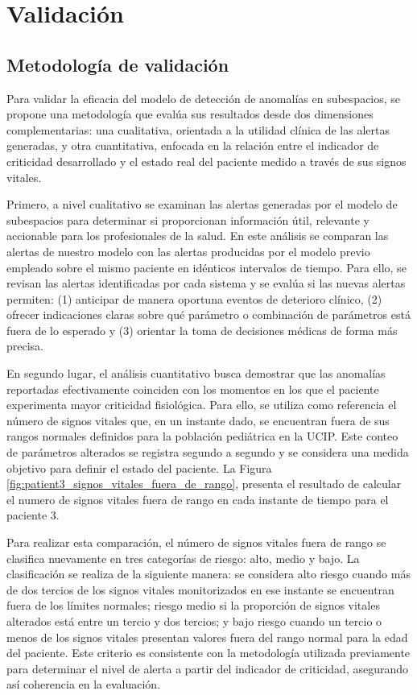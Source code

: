 \chapter{Validación}

\section{Metodología de validación}

Para validar la eficacia del modelo de detección de anomalías en subespacios, se propone una metodología que evalúa sus resultados desde dos dimensiones complementarias: una cualitativa, orientada a la utilidad clínica de las alertas generadas, y otra cuantitativa, enfocada en la relación entre el indicador de criticidad desarrollado y el estado real del paciente medido a través de sus signos vitales.

Primero, a nivel cualitativo se examinan las alertas generadas por el modelo de subespacios para determinar si proporcionan información útil, relevante y accionable para los profesionales de la salud. En este análisis se comparan las alertas de nuestro modelo con las alertas producidas por el modelo previo empleado sobre el mismo paciente en idénticos intervalos de tiempo. Para ello, se revisan las alertas identificadas por cada sistema y se evalúa si las nuevas alertas permiten: (1) anticipar de manera oportuna eventos de deterioro clínico, (2) ofrecer indicaciones claras sobre qué parámetro o combinación de parámetros está fuera de lo esperado y (3) orientar la toma de decisiones médicas de forma más precisa.

En segundo lugar, el análisis cuantitativo busca demostrar que las anomalías reportadas efectivamente coinciden con los momentos en los que el paciente experimenta mayor criticidad fisiológica. Para ello, se utiliza como referencia el número de signos vitales que, en un instante dado, se encuentran fuera de sus rangos normales definidos para la población pediátrica en la UCIP. Este conteo de parámetros alterados se registra segundo a segundo y se considera una medida objetivo para definir el estado del paciente. La Figura \ref{fig:patient3_signos_vitales_fuera_de_rango}, presenta el resultado de calcular el numero de signos vitales fuera de rango en cada instante de tiempo para el paciente 3.

Para realizar esta comparación, el número de signos vitales fuera de rango se clasifica nuevamente en tres categorías de riesgo: alto, medio y bajo. La clasificación se realiza de la siguiente manera: se considera alto riesgo cuando más de dos tercios de los signos vitales monitorizados en ese instante se encuentran fuera de los límites normales; riesgo medio si la proporción de signos vitales alterados está entre un tercio y dos tercios; y bajo riesgo cuando un tercio o menos de los signos vitales presentan valores fuera del rango normal para la edad del paciente. Este criterio es consistente con la metodología utilizada previamente para determinar el nivel de alerta a partir del indicador de criticidad, asegurando así coherencia en la evaluación.

